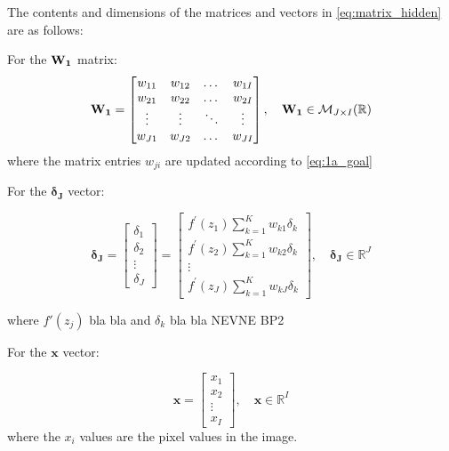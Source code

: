 \documentclass{article}
\begin{document}
The contents and dimensions of the matrices and vectors in \eqref{eq:matrix_hidden} are as follows: 

For the $\text{\textbf{W}}_\textbf{1}$ matrix:
\begin{equation}
    \text{\textbf{W}}_\textbf{1} =
    \begin{bmatrix}
        w_{11} & w_{12}& \dots & w_{1I} \\
         w_{21} & w_{22}& \dots & w_{2I} \\
        \vdots & \vdots & \ddots & \vdots \\
         w_{J1} & w_{J2}& \dots & w_{JI} \\
    \end{bmatrix}
    , \quad \text{\textbf{W}}_\textbf{1} \in \mathcal{M}_{J \times I}(\mathbb{R})
\end{equation}
where the matrix entries $w_{ji}$ are updated according to \eqref{eq:1a_goal}

For the $\boldsymbol{\delta_J}$ vector:

\begin{equation}
    \boldsymbol{\delta_J} = 
    \begin{bmatrix}
        \delta_1 \\
        \delta_2 \\
        \vdots \\
        \delta_J
    \end{bmatrix}
    = \begin{bmatrix}
        f^{\prime}\left(z_{1}\right) \sum_{k=1}^K w_{k 1} \delta_{k} \\
        f^{\prime}\left(z_{2}\right) \sum_{k=1}^K w_{k 2} \delta_{k} \\
        \vdots \\
        f^{\prime}\left(z_{J}\right) \sum_{k=1}^K w_{k J} \delta_{k}
    \end{bmatrix}
    , \quad \boldsymbol{\delta_J} \in \mathbb{R}^J
\end{equation}

where $f'(z_j)$ bla bla and $\delta_k$ bla bla NEVNE BP2

For the $\boldsymbol{x}$ vector:

\begin{equation}
    \boldsymbol{x} = 
    \begin{bmatrix}
        x_1 \\
        x_2 \\
        \vdots \\
        x_I
    \end{bmatrix}
    , \quad \boldsymbol{x} \in \mathbb{R}^I
\end{equation}
where the $x_i$ values are the pixel values in the image.
\end{document}
